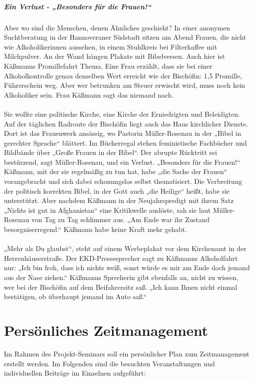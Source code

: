 \documentclass[a4paper,12pt,twoside]{scrbook}
\begin{document}
\paragraph{Ein Verlust - „Besonders für die Frauen!“}
Aber wo sind die Menschen, denen Ähnliches geschieht? In einer anonymen Suchtberatung in der Hannoveraner Südstadt sitzen am Abend Frauen, die nicht wie Alkoholikerinnen aussehen, in einem Stuhlkreis bei Filterkaffee mit Milchpulver. An der Wand hängen Plakate mit Bibelversen. Auch hier ist Käßmanns Promillefahrt Thema. Eine Frau erzählt, dass sie bei einer Alkoholkontrolle genau denselben Wert erreicht wie der Bischöfin: 1,5 Promille, Führerschein weg. Aber wer betrunken am Steuer erwischt wird, muss noch kein Alkoholiker sein. Frau Käßmann sagt das niemand nach.
\\\\
Sie wollte eine politische Kirche, eine Kirche der Erniedrigten und Beleidigten. Auf der täglichen Radroute der Bischöfin liegt auch das Haus kirchlicher Dienste. Dort ist das Frauenwerk ansässig, wo Pastorin Müller-Rosenau in der „Bibel in gerechter Sprache“ blättert. Im Bücherregal stehen feministische Fachbücher und Bildbände über „Große Frauen in der Bibel“. Der abrupte Rücktritt sei bestürzend, sagt Müller-Rosenau, und ein Verlust. „Besonders für die Frauen!“ Käßmann, mit der sie regelmäßig zu tun hat, habe „die Sache der Frauen“ vorangebracht und sich dabei schonungslos selbst thematisiert. Die Verbreitung der politisch korrekten Bibel, in der Gott auch „die Heilige“ heißt, habe sie unterstützt. Aber nachdem Käßmann in der Neujahrspredigt mit ihrem Satz „Nichts ist gut in Afghanistan“ eine Kritikwelle auslöste, sah sie laut Müller-Rosenau von Tag zu Tag schlimmer aus. „Am Ende war ihr Zustand besorgniserregend.“ Käßmann habe keine Kraft mehr gehabt.
\\\\
„Mehr als Du glaubst“, steht auf einem Werbeplakat vor dem Kirchenamt in der Herrenhäuserstraße. Der EKD-Pressesprecher sagt zu Käßmanns Alkoholfahrt nur: „Ich bin froh, dass ich nichts weiß, sonst würde es mir am Ende doch jemand aus der Nase ziehen.“ Käßmanns Sprecherin gibt ebenfalls an, nicht zu wissen, wer bei der Bischöfin auf dem Beifahrersitz saß. „Ich kann Ihnen nicht einmal bestätigen, ob überhaupt jemand im Auto saß.“
\chapter{Persönliches Zeitmanagement}
Im Rahmen des Projekt-Seminars soll ein persönlicher Plan zum Zeitmanagement erstellt werden.
Im Folgenden sind die besuchten Veranstaltungen und individuellen Beiträge im Einzelnen aufgeführt:\\
\end{document}
